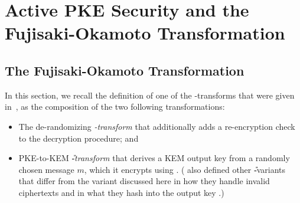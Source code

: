 \section{Active PKE Security and the Fujisaki-Okamoto Transformation}

  \subsection{The Fujisaki-Okamoto Transformation}
  	In this section, we recall the definition of one of the \FO-transforms that
      were given in~\cite{TCC:HofHovKil17}, as the composition of the two
      following transformations:

  	
  	\begin{itemize}
  		\item
  			The de-randomizing \emph{\T-transform} that additionally adds a re-encryption check to the decryption procedure;
  			and 
  		\item
  			PKE-to-KEM \emph{\U-transform} that derives a KEM output key \KEMoutputKey
  			from a randomly chosen message $m$, which it encrypts using \PKE.
  			(\cite{TCC:HofHovKil17} also defined other \U-variants that differ from the variant discussed here
  			in how they handle invalid ciphertexts and in what they hash into the output key \KEMoutputKey.)
  	\end{itemize} 
  	
